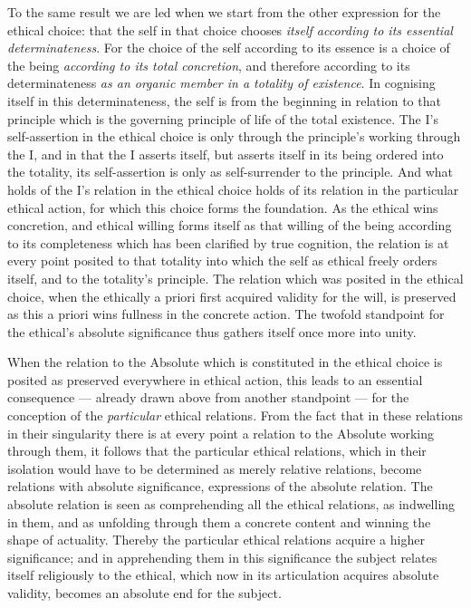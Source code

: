 \documentclass[12pt,a4paper]{book}
\begin{document}
To the same result we are led when we start from the other expression for the
ethical choice: that the self in that choice chooses \emph{itself according to
its essential determinateness}. For the choice of the self according to its
essence is a choice of the being \emph{according to its total concretion}, and
therefore according to its determinateness \emph{as an organic member in a
totality of existence}. In cognising itself in this determinateness, the self
is from the beginning in relation to that principle which is the governing
principle of life of the total existence. The I's self-assertion in the
ethical choice is only through the principle's working through the I,
and in that the I asserts itself, but asserts itself in its being ordered into
the totality, its self-assertion is only as self-surrender to the principle.
And what holds of the I's relation in the ethical choice holds of its relation
in the particular ethical action, for which this choice forms the foundation.
As the ethical wins concretion, and ethical willing forms itself as that
willing of the being according to its completeness which has been clarified by
true cognition, the relation is at every point posited to that totality into
which the self as ethical freely orders itself, and to the totality's
principle. The relation which was posited in the ethical choice, when the
ethically a priori first acquired validity for the will, is preserved as this
a priori wins fullness in the concrete action. The twofold standpoint for the
ethical's absolute significance thus gathers itself once more into unity.

When the relation to the Absolute which is constituted in the ethical choice
is posited as preserved everywhere in ethical action, this leads to an
essential consequence --- already drawn above from another standpoint --- for
the conception of the \emph{particular} ethical relations. From the fact that
in these relations in their singularity there is at every point a relation to
the Absolute working through them, it follows that the particular ethical
relations, which in their isolation would have to be determined as merely
relative relations, become relations with absolute significance, expressions
of the absolute relation. The absolute relation is seen as comprehending all
the ethical relations, as indwelling in them, and as unfolding through them a
concrete content and winning the shape of actuality. Thereby the particular
ethical relations acquire a higher significance; and in apprehending them in
this significance the subject relates itself religiously to the ethical, which
now in its articulation acquires absolute validity, becomes an absolute end
for the subject.
\end{document}

